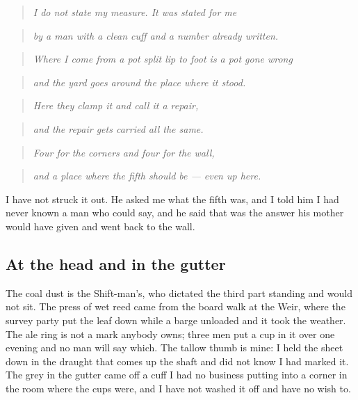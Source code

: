 \documentclass{design/chronicle}
\begin{document}
\begin{quote}\itshape I do not state my measure. It was stated for me\end{quote}

\begin{quote}\itshape by a man with a clean cuff and a number already written.\end{quote}

\begin{quote}\itshape Where I come from a pot split lip to foot is a pot gone wrong\end{quote}

\begin{quote}\itshape and the yard goes around the place where it stood.\end{quote}

\begin{quote}\itshape Here they clamp it and call it a repair,\end{quote}

\begin{quote}\itshape and the repair gets carried all the same.\end{quote}

\begin{quote}\itshape \end{quote}

\begin{quote}\itshape Four for the corners and four for the wall,\end{quote}

\begin{quote}\itshape and a place where the fifth should be --- even up here.\end{quote}

I have not struck it out. He asked me what the fifth was, and I told him I had never known a man who could say, and he said that was the answer his mother would have given and went back to the wall.

\subsection*{At the head and in the gutter}

The coal dust is the Shift-man’s, who dictated the third part standing and would not sit. The press of wet reed came from the board walk at the Weir, where the survey party put the leaf down while a barge unloaded and it took the weather. The ale ring is not a mark anybody owns; three men put a cup in it over one evening and no man will say which. The tallow thumb is mine: I held the sheet down in the draught that comes up the shaft and did not know I had marked it. The grey in the gutter came off a cuff I had no business putting into a corner in the room where the cups were, and I have not washed it off and have no wish to.
\end{document}
